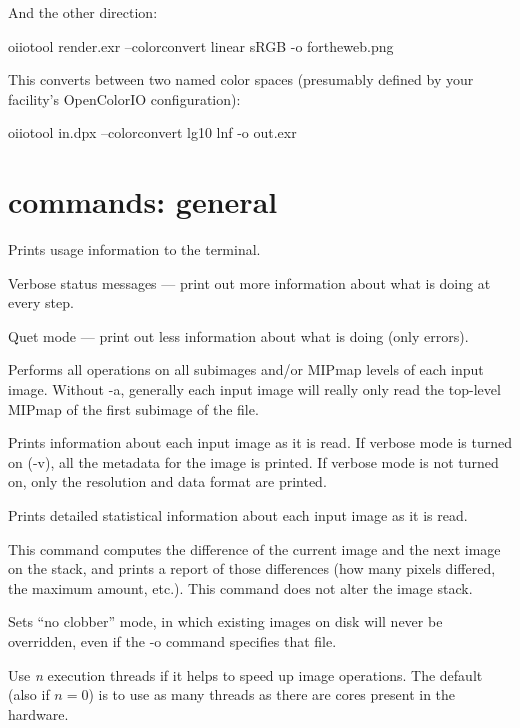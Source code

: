 \noindent And the other direction:

\begin{code}
    oiiotool render.exr --colorconvert linear sRGB -o fortheweb.png
\end{code}

\noindent This converts between two named color spaces (presumably
defined by your facility's OpenColorIO configuration):

\begin{code}
    oiiotool in.dpx --colorconvert lg10 lnf -o out.exr
\end{code}



\section{\oiiotool commands: general}

Prints usage information to the terminal.
\apiend

Verbose status messages --- print out more information about what
\oiiotool is doing at every step.
\apiend

Quet mode --- print out less information about what \oiiotool is doing
(only errors).
\apiend

Performs all operations on all subimages and/or MIPmap levels of each
input image.  Without {\cf -a}, generally each input image will really
only read the top-level MIPmap of the first subimage of the file.
\apiend

Prints information about each input image as it is read.  If verbose mode
is turned on ({\cf -v}), all the metadata for the image is printed.
If verbose mode is not turned on, only the resolution and data format
are printed.
\apiend

Prints detailed statistical information about each input image as it is
read.
\apiend

This command computes the difference of the current image and the next
image on the stack, and prints a report of those differences (how
many pixels differed, the maximum amount, etc.).  This command does not
alter the image stack.
\apiend

Sets ``no clobber'' mode, in which existing images on disk will never be 
overridden, even if the {\cf -o} command specifies that file.
\apiend

Use \emph{n} execution threads if it helps to speed up image operations.
The default (also if $n=0$) is to use as many threads as there are cores
present in the hardware.
\apiend


